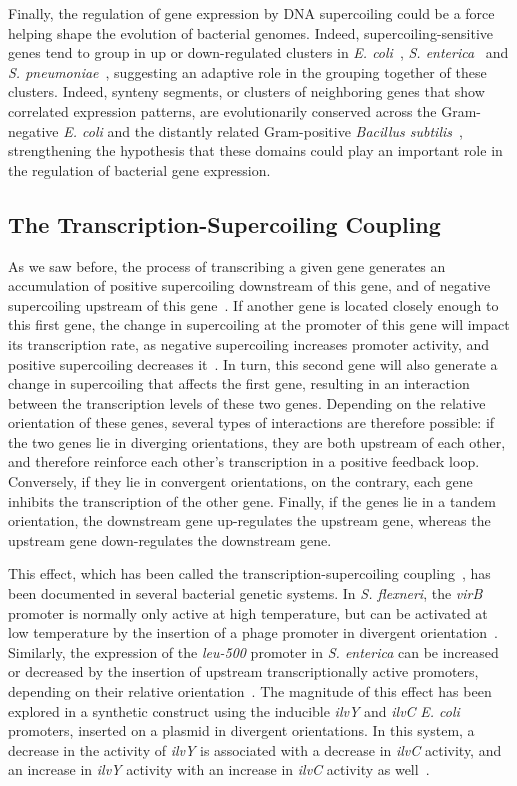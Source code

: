Finally, the regulation of gene expression by DNA supercoiling could be a force helping shape the evolution of bacterial genomes.
Indeed, supercoiling-sensitive genes tend to group in up or down-regulated clusters in \emph{E. coli}~\citep{peter2004}, \emph{S. enterica}~\citep{webber2013} and \emph{S. pneumoniae}~\citep{ferrandiz2010}, suggesting an adaptive role in the grouping together of these clusters.
Indeed, synteny segments, or clusters of neighboring genes that show correlated expression patterns, are evolutionarily conserved across the Gram-negative \emph{E. coli} and the distantly related Gram-positive \emph{Bacillus subtilis}~\citep{junier2016}, strengthening the hypothesis that these domains could play an important role in the regulation of bacterial gene expression.

\subsection{The Transcription-Supercoiling Coupling}

As we saw before, the process of transcribing a given gene generates an accumulation of positive supercoiling downstream of this gene, and of negative supercoiling upstream of this gene~\citep{liu1987}.
If another gene is located closely enough to this first gene, the change in supercoiling at the promoter of this gene will impact its transcription rate, as negative supercoiling increases promoter activity, and positive supercoiling decreases it~\citep{forquet2021}.
In turn, this second gene will also generate a change in supercoiling that affects the first gene, resulting in an interaction between the transcription levels of these two genes.
Depending on the relative orientation of these genes, several types of interactions are therefore possible: if the two genes lie in diverging orientations, they are both upstream of each other, and therefore reinforce each other's transcription in a positive feedback loop.
Conversely, if they lie in convergent orientations, on the contrary, each gene inhibits the transcription of the other gene.
Finally, if the genes lie in a tandem orientation, the downstream gene up-regulates the upstream gene, whereas the upstream gene down-regulates the downstream gene.

This effect, which has been called the transcription-supercoiling coupling~\citep{martisb.2019}, has been documented in several bacterial genetic systems.
In \emph{S. flexneri}, the \emph{virB} promoter is normally only active at high temperature, but can be activated at low temperature by the insertion of a phage promoter in divergent orientation~\citep{tobe1995}.
Similarly, the expression of the \emph{leu-500} promoter in \emph{S. enterica} can be increased or decreased by the insertion of upstream transcriptionally active promoters, depending on their relative orientation~\citep{elhanafi2000}.
The magnitude of this effect has been explored in a synthetic construct using the inducible \emph{ilvY} and \emph{ilvC} \emph{E. coli} promoters, inserted on a plasmid in divergent orientations.
In this system, a decrease in the activity of \emph{ilvY} is associated with a decrease in \emph{ilvC} activity, and an increase in \emph{ilvY} activity with an increase in \emph{ilvC} activity as well~\citep{rhee1999}.

